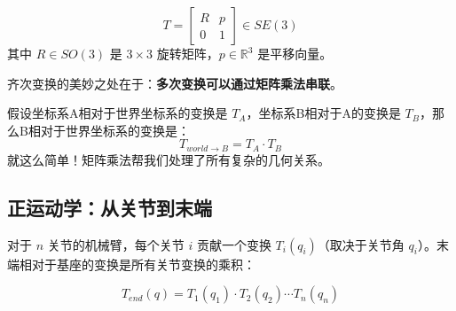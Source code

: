 \begin{definition}[齐次变换]
\begin{equation}
T = \begin{bmatrix} R & p \\ 0 & 1 \end{bmatrix} \in SE(3)
\end{equation}
其中 $R \in SO(3)$ 是 $3 \times 3$ 旋转矩阵，$p \in \mathbb{R}^3$ 是平移向量。
\end{definition}

齐次变换的美妙之处在于：\textbf{多次变换可以通过矩阵乘法串联}。

\begin{example}[两次变换的串联]
假设坐标系A相对于世界坐标系的变换是 $T_A$，坐标系B相对于A的变换是 $T_B$，那么B相对于世界坐标系的变换是：
\[
T_{world \to B} = T_A \cdot T_B
\]
就这么简单！矩阵乘法帮我们处理了所有复杂的几何关系。
\end{example}

\subsection{正运动学：从关节到末端}

对于 $n$ 关节的机械臂，每个关节 $i$ 贡献一个变换 $T_i(q_i)$（取决于关节角 $q_i$）。末端相对于基座的变换是所有关节变换的乘积：

\begin{equation}
T_{end}(q) = T_1(q_1) \cdot T_2(q_2) \cdots T_n(q_n)
\end{equation}

